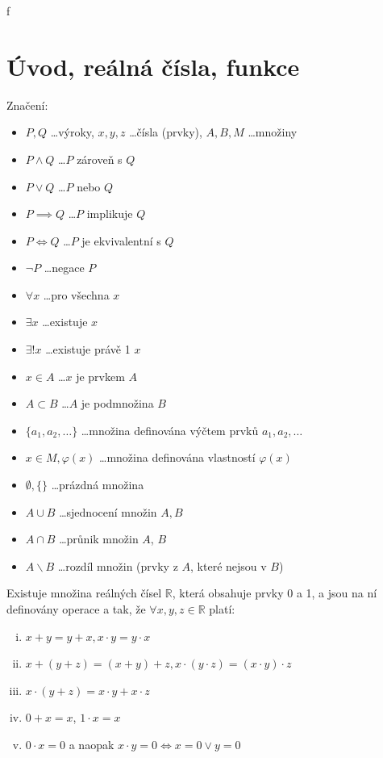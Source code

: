 f\section{Úvod, reálná čísla, funkce}

\begin{poznamka} Značení:
  \begin{itemize}
    \item $P, Q$ \dots výroky, $x, y, z$ \dots čísla (prvky), $A, B, M$ \dots množiny
    \item $P \land Q$ \dots $P$ zároveň s $Q$
    \item $P \lor Q$ \dots $P$ nebo $Q$
    \item $P \implies Q$ \dots $P$ implikuje $Q$
    \item $P \iff Q$ \dots $P$ je ekvivalentní s $Q$
    \item $\neg P$ \dots negace $P$
    \item $\forall x$ \dots pro všechna $x$
    \item $\exists x$ \dots existuje $x$
    \item $\exists! x$ \dots existuje právě 1 $x$
    \item $x \in A$ \dots $x$ je prvkem $A$
    \item $A \subset B$ \dots $A$ je podmnožina $B$
    \item $\{a_1, a_2, \dots\}$ \dots množina definována výčtem prvků $a_1, a_2, \dots$
    \item ${x \in M, \varphi(x)}$ \dots množina definována vlastností $\varphi(x)$
    \item $\emptyset, \{\}$ \dots prázdná množina
    \item $A \cup B$ \dots sjednocení množin $A, B$
    \item $A \cap B$ \dots průnik množin $A$, $B$
    \item $A \smallsetminus B$ \dots rozdíl množin (prvky z $A$, které nejsou v $B$)
  \end{itemize}
\end{poznamka}

\begin{axiom}
  Existuje množina reálných čísel $\mathbb{R}$, která obsahuje prvky 0 a 1, a jsou na ní definovány operace \uv{$\cdot$} a \uv{$+$} tak, že $\forall x, y, z \in \mathbb{R}$ platí:
  \begin{enumerate}[i.]
    \item $x+y = y+x, x \cdot y = y \cdot x$
    \item $x+(y+z) = (x+y)+z, x\cdot (y\cdot z) = (x \cdot y) \cdot z$
    \item $x \cdot (y+z) = x \cdot y + x \cdot z$
    \item $0 + x = x$, $1 \cdot x = x$
    \item $0 \cdot x = 0$ a naopak $x \cdot y = 0 \iff x = 0 \lor y = 0$
  \end{enumerate}
\end{axiom}

